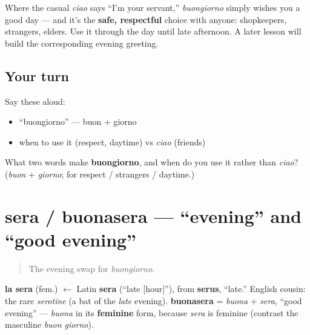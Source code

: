\begin{culture}
Where the casual \emph{ciao} says \textquotedblleft{}I'm your servant,\textquotedblright{} \emph{buongiorno} simply wishes you a good day — and it's the \textbf{safe, respectful} choice with anyone: shopkeepers, strangers, elders. Use it through the day until late afternoon. A later lesson will build the corresponding evening greeting.
\end{culture}

\subsection*{Your turn}
Say these aloud:

\begin{itemize}
\raggedright
  \item \textquotedblleft{}buongiorno\textquotedblright{} — buon + giorno
  \item when to use it (respect, daytime) vs \emph{ciao} (friends)
\end{itemize}

\begin{tcolorbox}[breakable,colback=teal!4,colframe=teal!35!black,title={Before you move on}]
What two words make \textbf{buongiorno}, and when do you use it rather than \emph{ciao}? (\emph{buon} + \emph{giorno}; for respect / strangers / daytime.)
\end{tcolorbox}
\section[sera / buonasera]{sera / buonasera — \textquotedblleft{}evening\textquotedblright{} and \textquotedblleft{}good evening\textquotedblright{}}

\label{lesson:IT-C01-sera}



\begin{quote}
The evening swap for \emph{buongiorno}.
\end{quote}

\begin{cousinweb}
\textbf{la sera} (fem.) $\leftarrow$ Latin \textbf{sera} (\textquotedblleft{}late {[}hour{]}\textquotedblright{}), from \textbf{serus}, \textquotedblleft{}late.\textquotedblright{} English cousin: the rare \emph{serotine} (a bat of the \emph{late} evening). \textbf{buonasera} = \emph{buona} + \emph{sera}, \textquotedblleft{}good evening\textquotedblright{} — \emph{buona} in its \textbf{feminine} form, because \emph{sera} is feminine (contrast the masculine \emph{buon giorno}).
\end{cousinweb}

